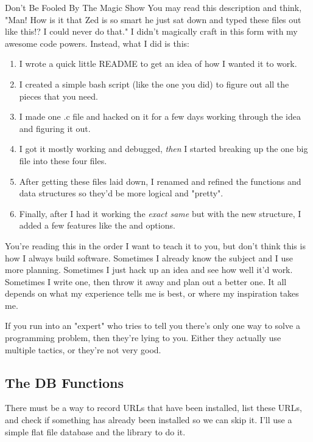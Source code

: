 \begin{aside}{Don't Be Fooled By The Magic Show}
You may read this description and think, "Man! How is it that Zed is
so smart he just sat down and typed these files out like this!? I
could never do that."  I didn't magically craft  
in this form with my awesome code powers.  Instead, what I did is this:

\begin{enumerate}
\item I wrote a quick little README to get an idea of how I wanted it
    to work.
\item I created a simple bash script (like the one you did) to figure
    out all the pieces that you need.
\item I made one .c file and hacked on it for a few days working through
    the idea and figuring it out.
\item I got it mostly working and debugged, \emph{then} I started
    breaking up the one big file into these four files.
\item After getting these files laid down, I renamed and refined the
    functions and data structures so they'd be more logical and "pretty".
\item Finally, after I had it working the \emph{exact same} but with
    the new structure, I added a few features like the  and
     options.
\end{enumerate}

You're reading this in the order I want to teach it to you, but don't think
this is how I always build software.  Sometimes I already know the subject and
I use more planning.  Sometimes I just hack up an idea and see how well it'd
work.  Sometimes I write one, then throw it away and plan out a better one.  It
all depends on what my experience tells me is best, or where my inspiration
takes me.

If you run into an "expert" who tries to tell you there's only one
way to solve a programming problem, then they're lying to you.  Either
they actually use multiple tactics, or they're not very good.
\end{aside}

\subsection{The DB Functions}

There must be a way to record URLs that have been installed, list these
URLs, and check if something has already been installed so we can
skip it.  I'll use a simple flat file database and the 
library to do it.

